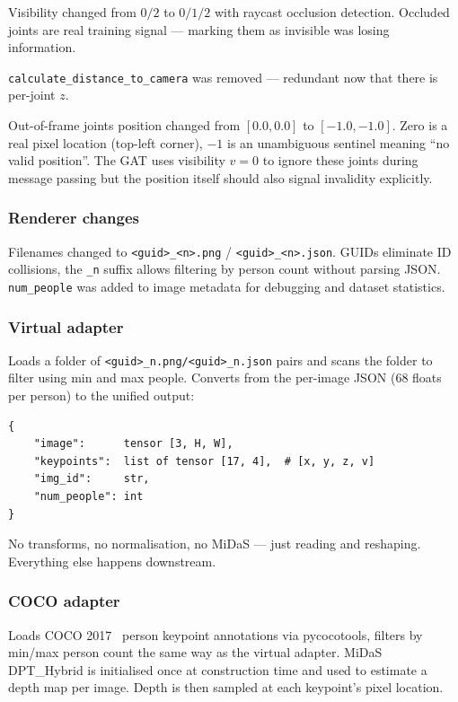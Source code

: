 Visibility changed from $0/2$ to $0/1/2$ with raycast occlusion detection. Occluded joints are real training signal --- marking them as invisible was losing information.

\texttt{calculate\_distance\_to\_camera} was removed --- redundant now that there is per-joint $z$.

Out-of-frame joints position changed from $[0.0, 0.0]$ to $[-1.0, -1.0]$. Zero is a real pixel location (top-left corner), $-1$ is an unambiguous sentinel meaning ``no valid position''. The GAT uses visibility $v=0$ to ignore these joints during message passing but the position itself should also signal invalidity explicitly.


\subsubsection{Renderer changes}

Filenames changed to \texttt{<guid>\_<n>.png} / \texttt{<guid>\_<n>.json}. GUIDs eliminate ID collisions, the \texttt{\_n} suffix allows filtering by person count without parsing JSON. \texttt{num\_people} was added to image metadata for debugging and dataset statistics.


\subsubsection{Virtual adapter}

Loads a folder of \texttt{<guid>\_n.png/<guid>\_n.json} pairs and scans the folder to filter using min and max people. Converts from the per-image JSON (68 floats per person) to the unified output:

\begin{verbatim}
{
    "image":      tensor [3, H, W],
    "keypoints":  list of tensor [17, 4],  # [x, y, z, v]
    "img_id":     str,
    "num_people": int
}
\end{verbatim}

No transforms, no normalisation, no MiDaS --- just reading and reshaping. Everything else happens downstream.


\subsubsection{COCO adapter}

Loads COCO 2017~\cite{lin2014coco} person keypoint annotations via pycocotools, filters by min/max person count the same way as the virtual adapter. MiDaS DPT\_Hybrid is initialised once at construction time and used to estimate a depth map per image. Depth is then sampled at each keypoint's pixel location.

